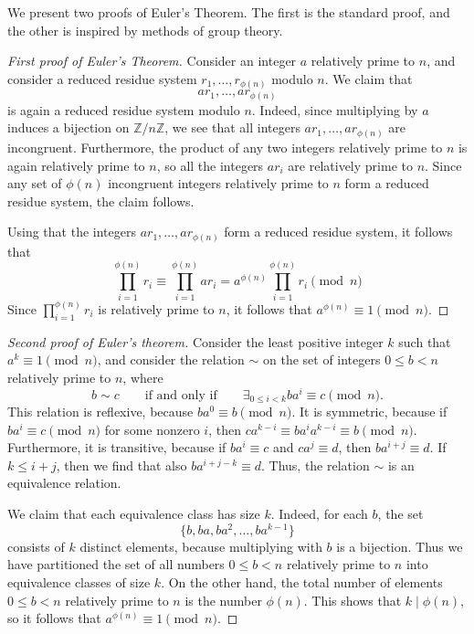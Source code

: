 We present two proofs of Euler's Theorem. The first is the standard proof, and the other is inspired by methods of group theory.

\begin{proof}[First proof of Euler's Theorem]
  Consider an integer $a$ relatively prime to $n$, and consider a reduced residue system $r_1,\ldots,r_{\phi(n)}$ modulo $n$. We claim that
  \begin{equation*}
    ar_1,\ldots,ar_{\phi(n)}
  \end{equation*}
  is again a reduced residue system modulo $n$. Indeed, since multiplying by $a$ induces a bijection on $\mathbb{Z}/n\mathbb{Z}$, we see that all integers $ar_1,\ldots,ar_{\phi(n)}$ are incongruent. Furthermore, the product of any two integers relatively prime to $n$ is again relatively prime to $n$, so all the integers $ar_i$ are relatively prime to $n$. Since any set of $\phi(n)$ incongruent integers relatively prime to $n$ form a reduced residue system, the claim follows.

  Using that the integers $ar_1,\ldots,ar_{\phi(n)}$ form a reduced residue system, it follows that
  \begin{equation*}
    \prod_{i=1}^{\phi(n)}r_i\equiv \prod_{i=1}^{\phi(n)}ar_i = a^{\phi(n)}\prod_{i=1}^{\phi(n)}r_i\pmod{n}
  \end{equation*}
  Since $\prod_{i=1}^{\phi(n)}r_i$ is relatively prime to $n$, it follows that $a^{\phi(n)}\equiv 1\pmod{n}$.
\end{proof}

\begin{proof}[Second proof of Euler's theorem]
  Consider the least positive integer $k$ such that $a^k\equiv 1\pmod{n}$, and consider the relation $\sim$ on the set of integers $0\leq b<n$ relatively prime to $n$, where
  \begin{equation*}
    b\sim c \qquad\text{if and only if}\qquad \exists_{0\leq i< k} ba^i\equiv c\pmod{n}.
  \end{equation*}
  This relation is reflexive, because $ba^0 \equiv b\pmod{n}$. It is symmetric, because if $ba^i\equiv c\pmod{n}$ for some nonzero $i$, then $ca^{k-i}\equiv ba^ia^{k-i}\equiv b\pmod{n}$. Furthermore, it is transitive, because if $ba^i\equiv c$ and $ca^j\equiv d$, then $ba^{i+j}\equiv d$. If $k\leq i+j$, then we find that also $ba^{i+j-k}\equiv d$. Thus, the relation $\sim$ is an equivalence relation.

  We claim that each equivalence class has size $k$. Indeed, for each $b$, the set
  \begin{equation*}
    \{b,ba,ba^2,\ldots,ba^{k-1}\}
  \end{equation*}
  consists of $k$ distinct elements, because multiplying with $b$ is a bijection. Thus we have partitioned the set of all numbers $0\leq b<n$ relatively prime to $n$ into equivalence classes of size $k$. On the other hand, the total number of elements $0\leq b<n$ relatively prime to $n$ is the number $\phi(n)$. This shows that $k\mid \phi(n)$, so it follows that $a^{\phi(n)}\equiv 1\pmod{n}$.
\end{proof}

